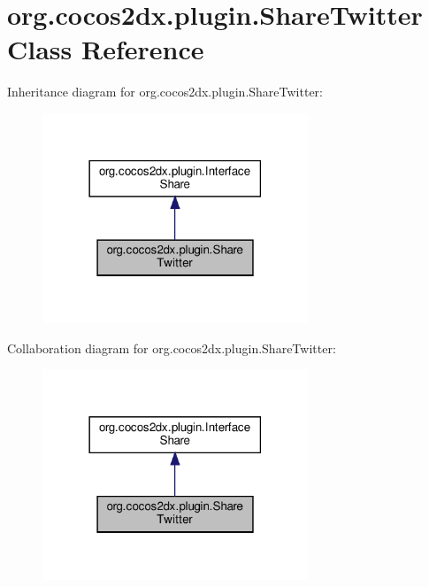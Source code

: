 \hypertarget{classorg_1_1cocos2dx_1_1plugin_1_1ShareTwitter}{}\section{org.\+cocos2dx.\+plugin.\+Share\+Twitter Class Reference}
\label{classorg_1_1cocos2dx_1_1plugin_1_1ShareTwitter}


Inheritance diagram for org.\+cocos2dx.\+plugin.\+Share\+Twitter\+:
\nopagebreak
\begin{figure}[H]
\begin{center}
\leavevmode
\includegraphics[width=225pt]{classorg_1_1cocos2dx_1_1plugin_1_1ShareTwitter__inherit__graph}
\end{center}
\end{figure}


Collaboration diagram for org.\+cocos2dx.\+plugin.\+Share\+Twitter\+:
\nopagebreak
\begin{figure}[H]
\begin{center}
\leavevmode
\includegraphics[width=225pt]{classorg_1_1cocos2dx_1_1plugin_1_1ShareTwitter__coll__graph}
\end{center}
\end{figure}
